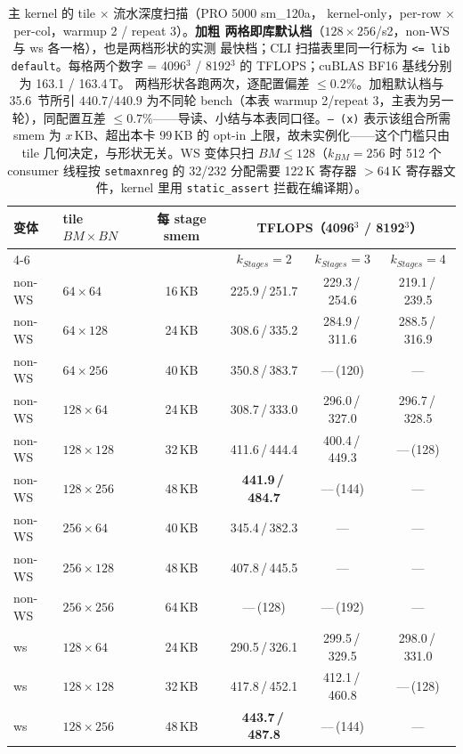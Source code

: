 \begin{table}[H]
\centering
\scriptsize
\begin{tabular}{llcccc}
\toprule
变体 & tile $BM\times BN$ & 每 stage smem &
  \multicolumn{3}{c}{TFLOPS（4096$^3$ / 8192$^3$）} \\
\cmidrule(l){4-6}
 & & & $k_{Stages}{=}2$ & $k_{Stages}{=}3$ & $k_{Stages}{=}4$ \\
\midrule
non-WS & $64\times64$   & 16\,KB & 225.9\,/\,251.7 & 229.3\,/\,254.6 & 219.1\,/\,239.5 \\
non-WS & $64\times128$  & 24\,KB & 308.6\,/\,335.2 & 284.9\,/\,311.6 & 288.5\,/\,316.9 \\
non-WS & $64\times256$  & 40\,KB & 350.8\,/\,383.7 & ---\,(120) & --- \\
non-WS & $128\times64$  & 24\,KB & 308.7\,/\,333.0 & 296.0\,/\,327.0 & 296.7\,/\,328.5 \\
non-WS & $128\times128$ & 32\,KB & 411.6\,/\,444.4 & 400.4\,/\,449.3 & ---\,(128) \\
non-WS & $128\times256$ & 48\,KB & \textbf{441.9\,/\,484.7} & ---\,(144) & --- \\
non-WS & $256\times64$  & 40\,KB & 345.4\,/\,382.3 & --- & --- \\
non-WS & $256\times128$ & 48\,KB & 407.8\,/\,445.5 & --- & --- \\
non-WS & $256\times256$ & 64\,KB & ---\,(128) & ---\,(192) & --- \\
\midrule
ws & $128\times64$  & 24\,KB & 290.5\,/\,326.1 & 299.5\,/\,329.5 & 298.0\,/\,331.0 \\
ws & $128\times128$ & 32\,KB & 417.8\,/\,452.1 & 412.1\,/\,460.8 & ---\,(128) \\
ws & $128\times256$ & 48\,KB & \textbf{443.7\,/\,487.8} & ---\,(144) & --- \\
\bottomrule
\end{tabular}
\caption{主 kernel 的 tile $\times$ 流水深度扫描（PRO 5000 sm\_120a，
kernel-only，per-row $\times$ per-col，warmup 2 / repeat 3）。\textbf{加粗
两格即库默认档}（$128\times256$/s2，non-WS 与 ws 各一格），也是两档形状的实测
最快档；CLI 扫描表里同一行标为 \texttt{<= lib default}。每格两个数字
= 4096$^3$ / 8192$^3$ 的 TFLOPS；cuBLAS BF16 基线分别为 163.1 / 163.4\,T。
两档形状各跑两次，逐配置偏差 $\le0.2\%$。加粗默认档与 35.6~节所引
$440.7/440.9$ 为不同轮 bench（本表 warmup 2/repeat 3，主表为另一轮），同配置互差
$\le0.7\%$——导读、小结与本表同口径。\texttt{---\,(x)} 表示该组合所需
smem 为 $x$\,KB、超出本卡 99\,KB 的 opt-in 上限，故未实例化——这个门槛只由
tile 几何决定，与形状无关。WS 变体只扫 $BM\le128$（$k_{BM}{=}256$ 时 512 个
consumer 线程按 \texttt{setmaxnreg} 的 32/232 分配需要 122\,K 寄存器
$>64$\,K 寄存器文件，kernel 里用 \texttt{static\_assert} 拦截在编译期）。}
\label{tab:35-sweep}
\end{table}

